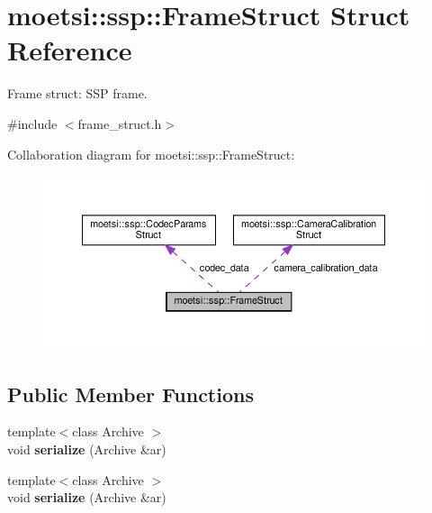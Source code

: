 \hypertarget{structmoetsi_1_1ssp_1_1FrameStruct}{}\section{moetsi\+:\+:ssp\+:\+:Frame\+Struct Struct Reference}
\label{structmoetsi_1_1ssp_1_1FrameStruct}


Frame struct\+: S\+SP frame.  




{\ttfamily \#include $<$frame\+\_\+struct.\+h$>$}



Collaboration diagram for moetsi\+:\+:ssp\+:\+:Frame\+Struct\+:
\nopagebreak
\begin{figure}[H]
\begin{center}
\leavevmode
\includegraphics[width=350pt]{structmoetsi_1_1ssp_1_1FrameStruct__coll__graph}
\end{center}
\end{figure}
\subsection*{Public Member Functions}
\begin{DoxyCompactItemize}
\item 
\mbox{\label{structmoetsi_1_1ssp_1_1FrameStruct_af53f4e76978e2a4575b7cd661d30e01f}} 
{\footnotesize template$<$class Archive $>$ }\\void {\bfseries serialize} (Archive \&ar)
\item 
\mbox{\label{structmoetsi_1_1ssp_1_1FrameStruct_af53f4e76978e2a4575b7cd661d30e01f}} 
{\footnotesize template$<$class Archive $>$ }\\void {\bfseries serialize} (Archive \&ar)
\end{DoxyCompactItemize}
